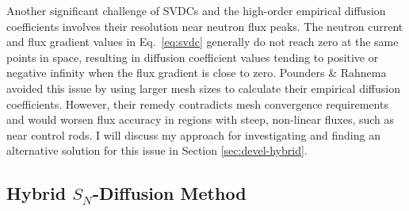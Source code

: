 Another significant challenge of \glspl{SVDC} and the high-order empirical diffusion coefficients
involves their resolution near neutron flux peaks. The neutron current and flux gradient values in
Eq.\ \ref{eq:svdc} generally do not reach zero at the same points in space,
resulting in diffusion coefficient values tending to positive or negative infinity when the
flux gradient is close to zero. Pounders \& Rahnema avoided this issue by using
larger mesh sizes to calculate their empirical diffusion coefficients. However, their
remedy contradicts mesh convergence requirements and would worsen flux accuracy in regions with
steep, non-linear fluxes, such as near control rods. I will discuss my approach for investigating
and finding an alternative solution for this issue in Section \ref{sec:devel-hybrid}.

\subsection{Hybrid $S_N$-Diffusion Method} \label{sec:hybrid-method}

